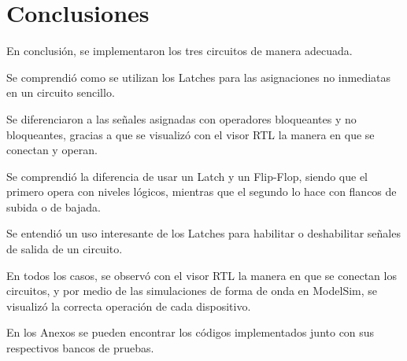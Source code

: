 \section{Conclusiones}
En conclusión, se implementaron los tres circuitos de manera adecuada.

Se comprendió como se utilizan los Latches para las asignaciones no inmediatas en un circuito sencillo.

Se diferenciaron a las señales asignadas con operadores bloqueantes y no bloqueantes, gracias a que se visualizó con el visor RTL la manera en que se conectan y operan.

Se comprendió la diferencia de usar un Latch y un Flip-Flop, siendo que el primero opera con niveles lógicos, mientras que el segundo lo hace con flancos de subida o de bajada.

Se entendió un uso interesante de los Latches para habilitar o deshabilitar señales de salida de un circuito.

En todos los casos, se observó con el visor RTL la manera en que se conectan los circuitos, y por medio de las simulaciones de forma de onda en ModelSim, se visualizó la correcta operación de cada dispositivo.

En los Anexos se pueden encontrar los códigos implementados junto con sus respectivos bancos de pruebas. 